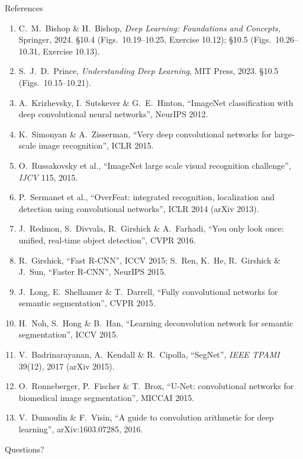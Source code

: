 \documentclass[aspectratio=169, 11pt]{beamer}
\newcommand{\nosrc}{}       %
\begin{document}
\begin{frame}[allowframebreaks]{References}
  \nosrc
  \vspace{0.3em}
  {\scriptsize
  \begin{enumerate}\itemsep0.30em
    \item C.\ M.\ Bishop \& H.\ Bishop, \emph{Deep Learning: Foundations
          and Concepts}, Springer, 2024. \S10.4 (Figs.~10.19--10.25,
          Exercise 10.12); \S10.5 (Figs.~10.26--10.31, Exercise 10.13).
    \item S.\ J.\ D.\ Prince, \emph{Understanding Deep Learning}, MIT
          Press, 2023. \S10.5 (Figs.~10.15--10.21).
    \item A.\ Krizhevsky, I.\ Sutskever \& G.\ E.\ Hinton, ``ImageNet
          classification with deep convolutional neural networks'',
          NeurIPS 2012.
    \item K.\ Simonyan \& A.\ Zisserman, ``Very deep convolutional
          networks for large-scale image recognition'', ICLR 2015.
    \item O.\ Russakovsky et al., ``ImageNet large scale visual
          recognition challenge'', \emph{IJCV} 115, 2015.
    \item P.\ Sermanet et al., ``OverFeat: integrated recognition,
          localization and detection using convolutional networks'',
          ICLR 2014 (arXiv 2013).
    \item J.\ Redmon, S.\ Divvala, R.\ Girshick \& A.\ Farhadi, ``You
          only look once: unified, real-time object detection'',
          CVPR 2016.
    \item R.\ Girshick, ``Fast R-CNN'', ICCV 2015; S.\ Ren, K.\ He,
          R.\ Girshick \& J.\ Sun, ``Faster R-CNN'', NeurIPS 2015.
    \item J.\ Long, E.\ Shelhamer \& T.\ Darrell, ``Fully convolutional
          networks for semantic segmentation'', CVPR 2015.
    \item H.\ Noh, S.\ Hong \& B.\ Han, ``Learning deconvolution network
          for semantic segmentation'', ICCV 2015.
    \item V.\ Badrinarayanan, A.\ Kendall \& R.\ Cipolla, ``SegNet'',
          \emph{IEEE TPAMI} 39(12), 2017 (arXiv 2015).
    \item O.\ Ronneberger, P.\ Fischer \& T.\ Brox, ``U-Net: convolutional
          networks for biomedical image segmentation'', MICCAI 2015.
    \item V.\ Dumoulin \& F.\ Visin, ``A guide to convolution arithmetic
          for deep learning'', arXiv:1603.07285, 2016.
  \end{enumerate}}
\end{frame}

\begin{frame}[standout]
  \nosrc
  Questions?
\end{frame}
\end{document}

